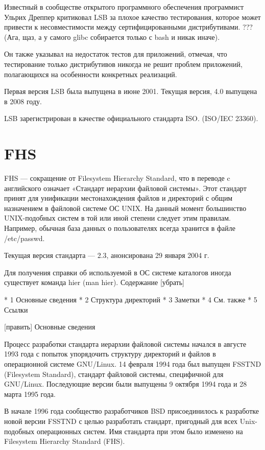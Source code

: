 Известный в сообществе открытого программного обеспечения программист Ульрих Дреппер критиковал LSB за плохое качество тестирования, которое может привести к несовместимости между сертифицированными дистрибутивами. ??? (Ага, щаз, а у самого glibc собирается только с bash и никак иначе).

Он также указывал на недостаток тестов для приложений, отмечая, что тестирование только дистрибутивов никогда не решит проблем приложений, полагающихся на особенности конкретных реализаций.

Первая версия LSB была выпущена в июне 2001. Текущая версия, 4.0 выпущена в 2008 году.

LSB зарегистрирован в качестве официального стандарта ISO. (ISO/IEC 23360).
\section {FHS}
FHS — сокращение от Filesystem Hierarchy Standard, что в переводе c английского означает «Стандарт иерархии файловой системы». Этот стандарт принят для унификации местонахождения файлов и директорий с общим назначением в файловой системе ОС UNIX. На данный момент большинство UNIX-подобных систем в той или иной степени следует этим правилам. Например, обычная база данных о пользователях всегда хранится в файле /etc/passwd.

Текущая версия стандарта — 2.3, анонсирована 29 января 2004 г.

Для получения справки об используемой в ОС системе каталогов иногда существует команда hier (man hier).
Содержание
[убрать]

    * 1 Основные сведения
    * 2 Структура директорий
    * 3 Заметки
    * 4 См. также
    * 5 Ссылки

[править] Основные сведения

Процесс разработки стандарта иерархии файловой системы начался в августе 1993 года с попыток упорядочить структуру директорий и файлов в операционной системе GNU/Linux. 14 февраля 1994 года был выпущен FSSTND (Filesystem Standard), стандарт файловой системы, специфичной для GNU/Linux. Последующие версии были выпущены 9 октября 1994 года и 28 марта 1995 года.

В начале 1996 года сообщество разработчиков BSD присоединилось к разработке новой версии FSSTND с целью разработать стандарт, пригодный для всех Unix-подобных операционных систем. Имя стандарта при этом было изменено на Filesystem Hierarchy Standard (FHS).

